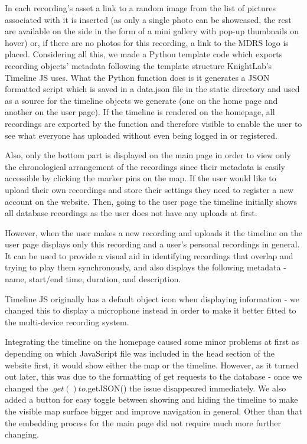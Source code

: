 \documentclass{l3proj}
\begin{document}
In each recording's asset a link to a random image from the list of pictures associated with it is inserted (as only a single photo can be showcased, the rest are available on the side in the form of a mini gallery with pop-up thumbnails on hover) or, if there are no photos for this recording, a link to the MDRS logo is placed. Considering all this, we made a \gls{Python} template code which exports recording objects' metadata following the template structure KnightLab's Timeline JS uses. What the Python function does is it generates a JSON formatted script which is saved in a data.json file in the static directory and used as a source for the timeline objects we generate (one on the home page and another on the user page). If the timeline is rendered on the homepage, all recordings are exported by the function and therefore visible to enable the user to see what everyone has uploaded without even being logged in or registered.

Also, only the bottom part is displayed on the main page in order to view only the chronological arrangement of the recordings since their metadata is easily accessible by clicking the marker pins on the map.
If the user would like to upload their own recordings and store their settings they need to register a new account on the website.
Then, going to the user page the timeline initially shows all database recordings as the user does not have any uploads at first.

However, when the user makes a new recording and uploads it the timeline on the user page displays only this recording and a user's personal recordings in general.
It can be used to provide a visual aid in identifying recordings that overlap and trying to play them synchronously, and also displays the following metadata - name, start/end time, duration, and description.

Timeline JS originally has a default object icon when displaying information - we changed this to display a microphone instead in order to make it better fitted to the multi-device recording system.

Integrating the timeline on the homepage caused some minor problems at first as depending on which JavaScript file was included in the head section of the website first, it would show either the map or the timeline. However, as it turned out later, this was due to the formatting of get requests to the database - once we changed the $.get() to $.getJSON() the issue disappeared immediately. We also added a button for easy toggle between showing and hiding the timeline to make the visible map surface bigger and improve navigation in general.
Other than that the embedding process for the main page did not require much more further changing.
\end{document}
